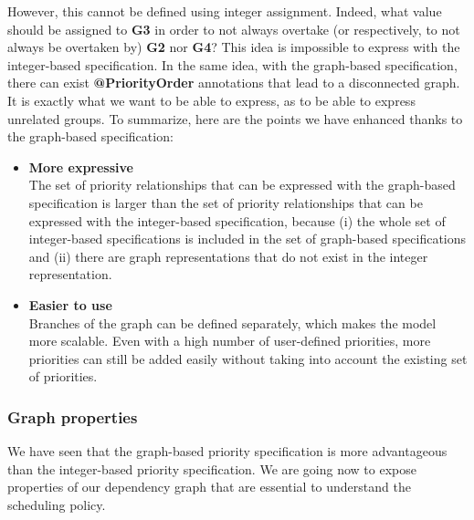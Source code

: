 \documentclass[11pt]{report}
\begin{document}
However, this cannot be defined using integer assignment. Indeed, what value should be assigned to \textbf{G3} in order to not always overtake (or respectively, to not always be overtaken by) \textbf{G2} nor \textbf{G4}? This idea is impossible to express with the integer-based specification.
In the same idea, with the graph-based specification, there can exist \textbf{@PriorityOrder} annotations that lead to a disconnected graph. It is exactly what we want to be able to express, as to be able to express unrelated groups. To summarize, here are the points we have enhanced thanks to the graph-based specification: 

\begin{itemize}
\item \textbf{More expressive}\\ The set of priority relationships that can be expressed with the graph-based specification is larger than the set of priority relationships that can be expressed with the integer-based specification, because (i) the whole set of integer-based specifications is included in the set of graph-based specifications and (ii) there are graph representations that do not exist in the integer representation.
\item \textbf{Easier to use}\\ Branches of the graph can be defined separately, which makes the model more scalable. Even with a high number of user-defined priorities, more priorities can still be added easily without taking into account the existing set of priorities.
\end{itemize}

\subsubsection{Graph properties}
We have seen that the graph-based priority specification is more advantageous than the integer-based priority specification. We are going now to expose properties of our dependency graph that are essential to understand the scheduling policy.\\
\end{document}
